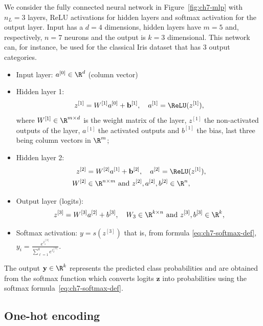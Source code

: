 We consider the fully connected neural network in Figure~\ref{fig:ch7-mlp} with $n_L = 3$ layers, ReLU activations for hidden layers and softmax activation for the output layer. Input has a $d = 4$ dimensions, hidden layers have $m = 5$ and, respectively, $n = 7$ neurons and the output is $k = 3$ dimensional. This network can, for instance, be used for the classical Iris dataset \cite{turinici14} that has 3 output categories.
\begin{itemize}
  \item Input layer: $a^{[0]} \in \R^d$ (column vector)
  \item Hidden layer 1:
  \begin{equation}\label{eq:ch7-hidden1}
    z^{[1]} = W^{[1]} a^{[0]} + \mathbf{b}^{[1]}, \quad a^{[1]} = \ReLU(z^{[1]}),
  \end{equation}
  where $W^{[1]} \in \R^{m \times d}$ is the weight matrix of the layer, $z^{[1]}$ the non-activated outputs of the layer, $a^{[1]}$ the activated outputs and $b^{[1]}$ the bias, last three being column vectors in $\R^m$;
  \item Hidden layer 2:
  \begin{equation}\label{eq:ch7-hidden2}
    \begin{aligned}
      z^{[2]} &= W^{[2]} a^{[1]} + \mathbf{b}^{[2]}, \quad a^{[2]} = \ReLU(z^{[1]}), \\
      W^{[2]} &\in \R^{n \times m} \text{ and } z^{[2]}, a^{[2]}, b^{[2]} \in \R^n,
    \end{aligned}
  \end{equation}
  \item Output layer (logits):
  \begin{equation}\label{eq:ch7-output-logits}
    z^{[3]} = W^{[3]} a^{[2]} + b^{[3]}, \quad W_3 \in \R^{k \times n} \text{ and } z^{[3]}, b^{[3]} \in \R^k,
  \end{equation}
  \item Softmax activation: $y = s(z^{[3]})$ that is, from formula \eqref{eq:ch7-softmax-def}, $y_i = \frac{e^{z^{[3]}_i}}{\sum_{\ell=1}^{k} e^{z^{[3]}_\ell}}$.
\end{itemize}
The output $\mathbf{y} \in \R^k$ represents the predicted class probabilities and are obtained from the softmax function which converts logits $\mathbf{z}$ into probabilities using the softmax formula~\eqref{eq:ch7-softmax-def}.

\subsection{One-hot encoding}

